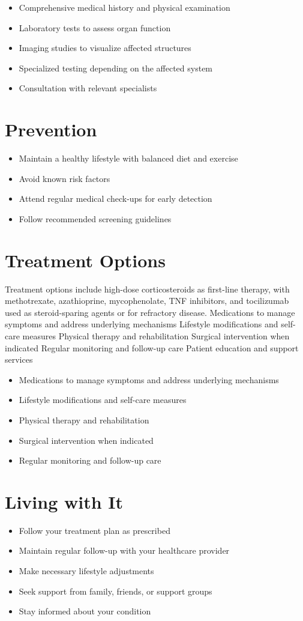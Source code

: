 \begin{itemize}[noitemsep]
  \item Comprehensive medical history and physical examination
  \item Laboratory tests to assess organ function
  \item Imaging studies to visualize affected structures
  \item Specialized testing depending on the affected system
  \item Consultation with relevant specialists
\end{itemize}
\section{Prevention}
\begin{itemize}[noitemsep]
  \item Maintain a healthy lifestyle with balanced diet and exercise
  \item Avoid known risk factors
  \item Attend regular medical check-ups for early detection
  \item Follow recommended screening guidelines
\end{itemize}
\section{Treatment Options}
Treatment options include high-dose corticosteroids as first-line therapy, with methotrexate, azathioprine, mycophenolate, TNF inhibitors, and tocilizumab used as steroid-sparing agents or for refractory disease. Medications to manage symptoms and address underlying mechanisms Lifestyle modifications and self-care measures Physical therapy and rehabilitation Surgical intervention when indicated Regular monitoring and follow-up care Patient education and support services

\begin{itemize}[noitemsep]
  \item Medications to manage symptoms and address underlying mechanisms
  \item Lifestyle modifications and self-care measures
  \item Physical therapy and rehabilitation
  \item Surgical intervention when indicated
  \item Regular monitoring and follow-up care
\end{itemize}
\section{Living with It}
\begin{itemize}[noitemsep]
  \item Follow your treatment plan as prescribed
  \item Maintain regular follow-up with your healthcare provider
  \item Make necessary lifestyle adjustments
  \item Seek support from family, friends, or support groups
  \item Stay informed about your condition
\end{itemize}
